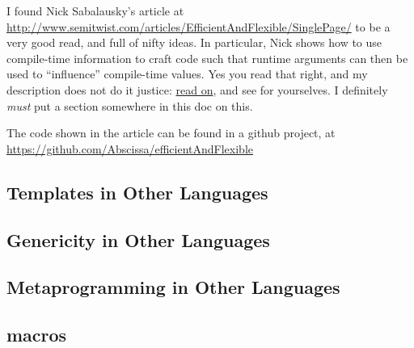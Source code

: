 I found Nick Sabalausky's article at \url{http://www.semitwist.com/articles/EfficientAndFlexible/SinglePage/} to be a very good read, and full of nifty ideas. In particular, Nick shows how to use compile-time information to craft code such that runtime arguments can then be used to ``influence'' compile-time values. Yes you read that right, and my description does not do it justice: \href{http://www.semitwist.com/articles/EfficientAndFlexible/SinglePage/#part6-3}{read on}, and see for yourselves. I definitely \emph{must} put a section somewhere in this doc on this.

The code shown in the article can be found in a github project, at \url{https://github.com/Abscissa/efficientAndFlexible}

\subsection{Templates in Other Languages}
\label{templatesinotherlanguages}


\subsection{Genericity in Other Languages}
\label{genericity}


\subsection{Metaprogramming in Other Languages}
\subsection{macros}



